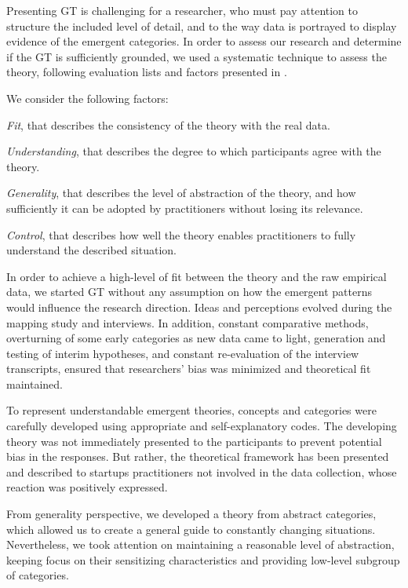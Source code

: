 \documentclass[10pt,journal,letterpaper,compsoc]{IEEEtran}
\begin{document}
Presenting GT is challenging for a researcher, who must pay attention to  
structure the included level of detail, and to the way data is portrayed to 
display evidence of the emergent categories.  In order to assess our research 
and determine if the GT is sufficiently grounded, we used a systematic technique 
to assess the theory, following evaluation lists and factors presented in  
\cite{Strauss1998}.

We consider the following factors:

\par\vspace {0.4cm}
\begin{compactitem}
\item \textit{Fit}, that describes the consistency of the theory with the real 
data.
\item \textit{Understanding}, that describes the degree to which participants 
agree with the theory.
\item \textit{Generality}, that describes the level of abstraction of the 
theory, and how sufficiently it can be adopted by practitioners without losing 
its relevance.
\item \textit{Control}, that describes how well the theory enables 
practitioners to fully understand the described situation.
\end{compactitem}
\par\vspace {0.4cm}

In order to achieve a high-level of fit between the theory and the raw 
empirical data, we started GT without any assumption on how the emergent 
patterns would influence the research direction. Ideas and perceptions evolved 
during the mapping study and interviews. In addition, constant comparative 
methods, overturning of some early categories as new data came to light, 
generation and testing of interim hypotheses, and constant re-evaluation of the 
interview transcripts, ensured that researchers' bias was minimized and 
theoretical fit maintained.

To represent understandable emergent theories, concepts and categories were 
carefully developed using appropriate and self-explanatory codes. The developing 
theory was not immediately presented to the participants to prevent potential 
bias in the responses. But rather, the theoretical framework has been presented 
and described to startups practitioners not involved in the data collection, 
whose reaction was positively expressed.

From generality perspective, we developed a theory from abstract categories, 
which allowed us to create a general guide to constantly changing situations. 
Nevertheless, we took attention on maintaining a reasonable level of 
abstraction, keeping focus on their sensitizing characteristics and providing 
low-level subgroup of categories.
\end{document}
